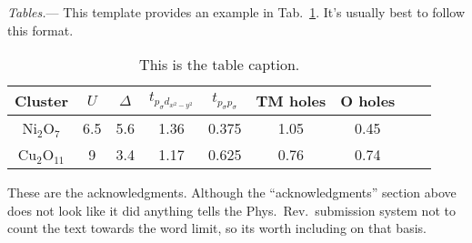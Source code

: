 \documentclass[aps,prl,showpacs,floatfix,twocolumn,superscriptaddress,longbibliography]{revtex4-2}
\begin{document}
\emph{Tables.}--- This template provides an example in Tab.~\ref{table_params}. It's usually best to follow this format. 
\begin{table}[hbt]
\caption{This is the table caption.}
\centering
\begin{ruledtabular}
\begin{tabular}{ccccccccc}
Cluster & $U$ & $\Delta$ & $t_{p_{\sigma}d_{x^2-y^2}}$ & $t_{p_{\sigma}p_{\sigma}}$ & TM holes & O holes  \\ 
\hline
Ni$_2$O$_7$ & 6.5 & 5.6 & 1.36 & 0.375   & 1.05 & 0.45  \\
Cu$_2$O$_{11}$  & 9 & 3.4 & 1.17 & 0.625 & 0.76 & 0.74 \\
\end{tabular}
\end{ruledtabular}
\label{table_params}
\end{table}

\begin{acknowledgments}
These are the acknowledgments. Although the ``acknowledgments'' section above does not look like it did anything tells the Phys.\ Rev.\ submission system not to count the text towards the word limit, so its worth including on that basis. 
\end{acknowledgments}


\end{document}
